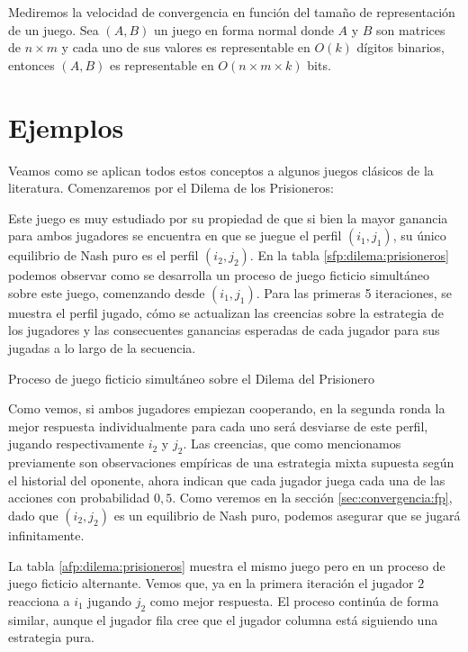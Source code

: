 Mediremos la velocidad de convergencia en función del tamaño de representación de un juego. Sea $(A, B)$ un juego en forma normal donde $A$ y $B$ son matrices de $n \times m$ y cada uno de sus valores es representable en $O(k)$ dígitos binarios, entonces $(A, B)$ es representable en $O(n \times m \times k)$ bits.


\section{Ejemplos}

Veamos como se aplican todos estos conceptos a algunos juegos clásicos de la literatura. Comenzaremos por el Dilema de los Prisioneros:




Este juego es muy estudiado por su propiedad de que si bien la mayor ganancia para ambos jugadores se encuentra en que se juegue el perfil $(i_1, j_1)$, su único equilibrio de Nash puro es el perfil $(i_2, j_2)$. En la tabla \ref{sfp:dilema:prisioneros} podemos observar como se desarrolla un proceso de juego ficticio simultáneo sobre este juego, comenzando desde $(i_1, j_1)$. Para las primeras 5 iteraciones, se muestra el perfil jugado, cómo se actualizan las creencias sobre la estrategia de los jugadores y las consecuentes ganancias esperadas de cada jugador para sus jugadas a lo largo de la secuencia.

\begin{table} %
    \centering
    
    \caption{Proceso de juego ficticio simultáneo sobre el Dilema del Prisionero}
    \label{sfp:dilema:prisioneros}
\end{table}

Como vemos, si ambos jugadores empiezan cooperando, en la segunda ronda la mejor respuesta individualmente para cada uno será desviarse de este perfil, jugando respectivamente $i_2$ y $j_2$. Las creencias, que como mencionamos previamente son observaciones empíricas de una estrategia mixta supuesta según el historial del oponente, ahora indican que cada jugador juega cada una de las acciones con probabilidad $0,5$. Como veremos en la sección \ref{sec:convergencia:fp}, dado que $(i_2, j_2)$ es un equilibrio de Nash puro, podemos asegurar que se jugará infinitamente.

La tabla \ref{afp:dilema:prisioneros} muestra el mismo juego pero en un proceso de juego ficticio alternante. Vemos que, ya en la primera iteración el jugador $2$ reacciona a $i_1$ jugando $j_2$ como mejor respuesta. El proceso continúa de forma similar, aunque el jugador fila cree que el jugador columna está siguiendo una estrategia pura.

